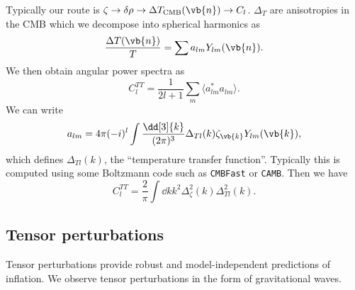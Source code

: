 \documentclass{jknotes}
\begin{document}
Typically our route is \(\zeta \to \delta\rho \to \Delta T_{\text{CMB}}(\vb{n}) \to C_l\). \(\Delta_T\) are anisotropies in the CMB which we decompose into spherical harmonics as
\begin{equation}
    \frac{\Delta T(\vb{n})}{T} = \sum a_{lm}Y_{lm}(\vb{n}).
\end{equation}
We then obtain angular power spectra as 
\begin{equation}
    C_l^{TT} = \frac1{2l+1}\sum_m\langle a^*_{lm}a_{lm}\rangle.
\end{equation}
We can write
\begin{equation}
    a_{lm} = 4\pi (-i)^l \int\frac{\dd[3]{k}}{(2\pi)^3} \Delta_{Tl}(k)\zeta_{\vb{k}}Y_{lm}(\vb{k}),
\end{equation}
which defines \(\Delta_{Tl}(k)\), the ``temperature transfer function''. Typically this is computed using some Boltzmann code such as \texttt{CMBFast} or \texttt{CAMB}. Then we have
\begin{equation}
    C_l^{TT} = \frac2\pi\int\dd{k}k^2\Delta^2_\zeta(k) \Delta_{Tl}^2(k).
\end{equation}

\subsection{Tensor perturbations}
Tensor perturbations provide robust and model-independent predictions of inflation. We observe tensor perturbations in the form of gravitational waves.
\end{document}
